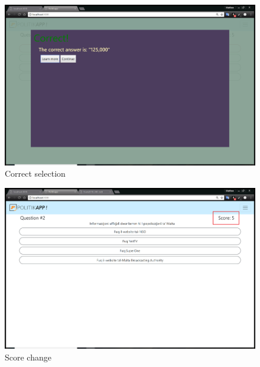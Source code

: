 \documentclass[paper=a4,fontsize=11pt]{article}
\begin{document}
\begin{figure}[H]
  \caption{Correct selection}
  \hfill\includegraphics[width=13cm]{Walkthrough/Q1_correct.PNG}\hspace*{\fill}
\end{figure}
\begin{figure}[H]
  \caption{Score change}
  \hfill\includegraphics[width=13cm]{Walkthrough/Scor_change.PNG}\hspace*{\fill}
\end{figure}
\end{document}
